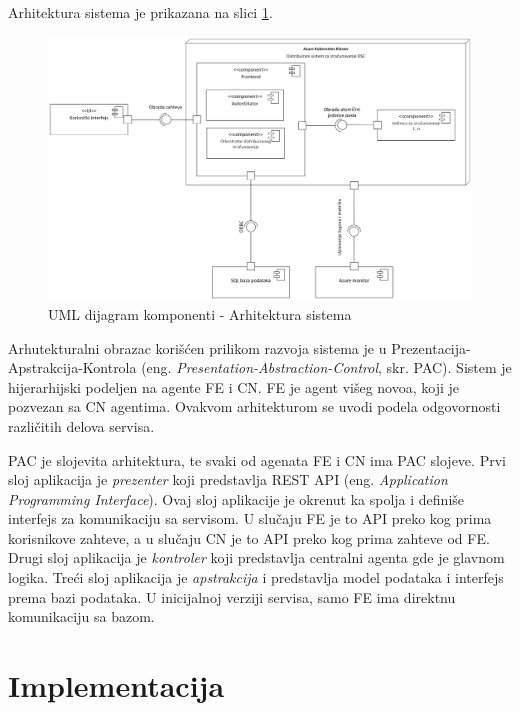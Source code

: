 \documentclass[12pt,oneside]{memoir}
\begin{document}
Arhitektura sistema je prikazana na slici \ref{fig:arhitektura}.

\begin{figure}[!ht]
  \centering
  \includegraphics[width=1.0\textwidth]{./images/arhitektura_sistema_dijagram_komponenti.png}
  \caption{UML dijagram komponenti - Arhitektura sistema}
  \label{fig:arhitektura}
\end{figure}

Arhutekturalni obrazac korišćen prilikom razvoja sistema je u Prezentacija-Apstrakcija-Kontrola (eng. \emph{Presentation-Abstraction-Control}, skr. PAC). Sistem je hijerarhijski podeljen na agente FE i CN. FE je agent višeg novoa, koji je pozvezan sa CN agentima. Ovakvom arhitekturom se uvodi podela odgovornosti različitih delova servisa.

PAC je slojevita arhitektura, te svaki od agenata FE i CN ima PAC slojeve. Prvi sloj aplikacija je \emph{prezenter} koji predstavlja REST API (eng. \emph{Application Programming Interface}). Ovaj sloj aplikacije je okrenut ka spolja i definiše interfejs za komunikaciju sa servisom. U slučaju FE je to API preko kog prima korisnikove zahteve, a u slučaju CN je to API preko kog prima zahteve od FE. Drugi sloj aplikacija je \emph{kontroler} koji predstavlja centralni agenta gde je glavnom logika. Treći sloj aplikacija je \emph{apstrakcija} i predstavlja model podataka i interfejs prema bazi podataka. U inicijalnoj verziji servisa, samo FE ima direktnu komunikaciju sa bazom.


\section{Implementacija}
\end{document}
